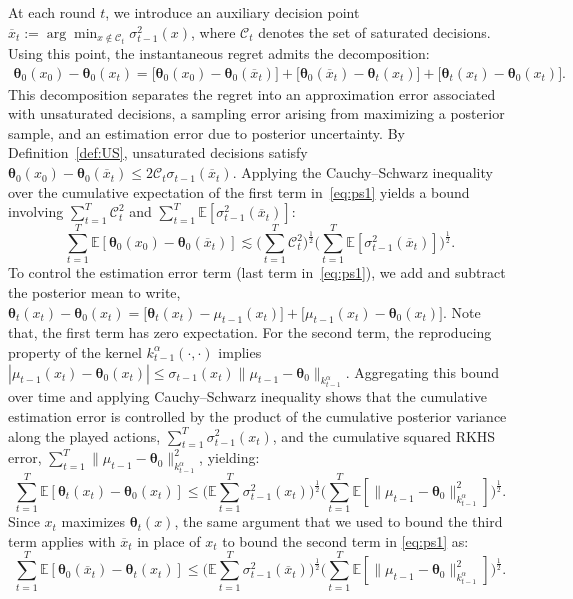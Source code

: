 \documentclass[final,12pt]{colt2026} %
\begin{document}
At each round $t$, we introduce an auxiliary decision point $\overline{x}_t := \arg\min_{x \notin \mathcal{C}_t} \sigma_{t-1}^2(x)$, where $\mathcal{C}_t$ denotes the set of saturated decisions. Using this point, the instantaneous regret admits the decomposition:
\begin{align}
\pmb\theta_0(x_0) - \pmb\theta_0(x_t)
=
\bigl[\pmb\theta_0(x_0) - \pmb\theta_0(\overline{x}_t)\bigr]
+
\bigl[\pmb\theta_0(\overline{x}_t) - \pmb\theta_t(x_t)\bigr]
+
\bigl[\pmb\theta_t(x_t) - \pmb\theta_0(x_t)\bigr].
\label{eq:ps1}
\end{align}
This decomposition separates the regret into an approximation error associated with unsaturated decisions, a sampling error arising from maximizing a posterior sample, and an estimation error due to posterior uncertainty. By Definition~\ref{def:US}, unsaturated decisions satisfy $\pmb\theta_0(x_0)-\pmb\theta_0(\overline{x}_t)\le 2\mathcal{C}_t\sigma_{t-1}(\overline{x}_t)$. Applying the Cauchy--Schwarz inequality over the cumulative expectation of the first term in~\eqref{eq:ps1} yields a bound involving $\sum_{t=1}^T \mathcal{C}_t^2$ and $\sum_{t=1}^T \mathbb{E}[\sigma_{t-1}^2(\overline{x}_t)]$:
\[
\sum_{t=1}^T \mathbb{E}\!\left[\pmb{\theta}_0(x_0) - \pmb{\theta}_0(\overline{x}_t)\right]
\lesssim
\Big(\sum_{t=1}^T \mathcal{C}_t^2\Big)^{\frac{1}{2}}
\Big(\sum_{t=1}^T \mathbb{E}[\sigma_{t-1}^2(\overline{x}_t)]\Big)^{\frac{1}{2}}.
\]
To control the estimation error term (last term in~\eqref{eq:ps1}), we add and subtract the posterior mean to write,
$\pmb\theta_t(x_t)-\pmb\theta_0(x_t)
=
\bigl[\pmb\theta_t(x_t)-\mu_{t-1}(x_t)\bigr]
+
\bigl[\mu_{t-1}(x_t)-\pmb\theta_0(x_t)\bigr]$.
Note that, the first term has zero expectation. For the second term, the reproducing property of the kernel $k_{t-1}^\alpha(\cdot, \cdot)$ implies
$
|\mu_{t-1}(x_t)-\pmb\theta_0(x_t)|
\le
\sigma_{t-1}(x_t)\|\mu_{t-1}-\pmb\theta_0\|_{k_{t-1}^\alpha}.
$
Aggregating this bound over time and applying Cauchy--Schwarz inequality shows that the cumulative estimation error is controlled by the product of the cumulative posterior variance along the played actions, $\sum_{t=1}^T \sigma_{t-1}^2(x_t)$, and the cumulative squared RKHS error, $\sum_{t=1}^T \|\mu_{t-1}-\pmb\theta_0\|_{k_{t-1}^\alpha}^2$, yielding:
\[
\sum_{t=1}^T \mathbb{E}\!\left[\pmb{\theta}_t(x_t) - \pmb{\theta}_0(x_t)\right]
\le
\Big(\mathbb{E}\!\sum_{t=1}^T\sigma_{t-1}^2(x_t)\Big)^{\!\frac{1}{2}}
\Big(\sum_{t=1}^T\mathbb{E}\!\left[\|\mu_{t-1}-\pmb{\theta}_0\|_{k_{t-1}^{\alpha}}^2\right]\Big)^{\!\frac{1}{2}}.
\]
Since $x_t$ maximizes $\pmb{\theta}_t(x)$, the same argument that we used to bound the third term applies with $\overline{x}_t$ in place of $x_t$ to bound the second term in \eqref{eq:ps1} as:
\[
\sum_{t=1}^T \mathbb{E}\!\left[\pmb{\theta}_0(\overline{x}_t)-\pmb{\theta}_t(x_t)\right]
\le
\Big(\mathbb{E}\!\sum_{t=1}^T\sigma_{t-1}^2(\overline{x}_t)\Big)^{\!\frac{1}{2}}
\Big(\sum_{t=1}^T\mathbb{E}\!\left[\|\mu_{t-1}-\pmb{\theta}_0\|_{k_{t-1}^{\alpha}}^2\right]\Big)^{\!\frac{1}{2}}.
\]
\end{document}
